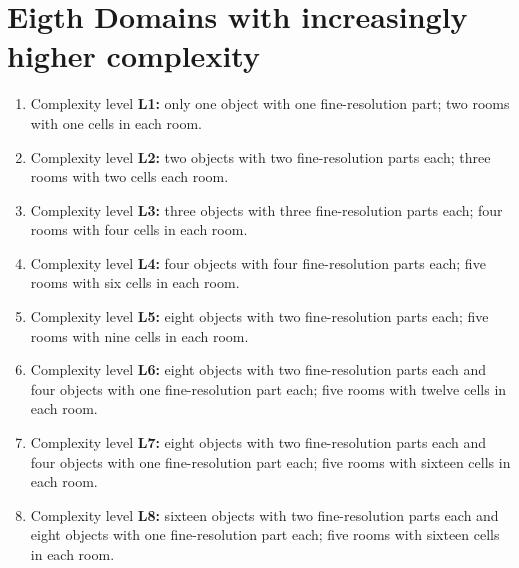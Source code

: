 \documentclass[11pt, oneside]{article}
\begin{document}
\section{Eigth Domains with increasingly higher complexity} 
\label{sec:expres}
\begin{enumerate}
\item Complexity level \textbf{L1:} only one object with one fine-resolution part; two rooms
  with one cells in each room.

\item Complexity level \textbf{L2:} two objects with two fine-resolution parts
  each; three rooms with two cells each room.

\item Complexity level \textbf{L3:} three objects with three fine-resolution parts
  each; four rooms with four cells in each room.

\item Complexity level \textbf{L4:} four objects with four fine-resolution parts
  each; five rooms with six cells in each room.

\item Complexity level \textbf{L5:} eight objects with two fine-resolution parts
  each; five rooms with nine cells in each room.

\item Complexity level \textbf{L6:} eight objects with two fine-resolution parts
  each and four objects with one fine-resolution part each; five rooms with twelve cells in each room.

\item Complexity level \textbf{L7:} eight objects with two fine-resolution parts
  each and four objects with one fine-resolution part each; five rooms with sixteen cells in each room.

\item Complexity level \textbf{L8:} sixteen objects with two fine-resolution parts
  each and eight objects with one fine-resolution part each; five rooms with sixteen cells in each room.
\end{enumerate}


 
\end{document}
